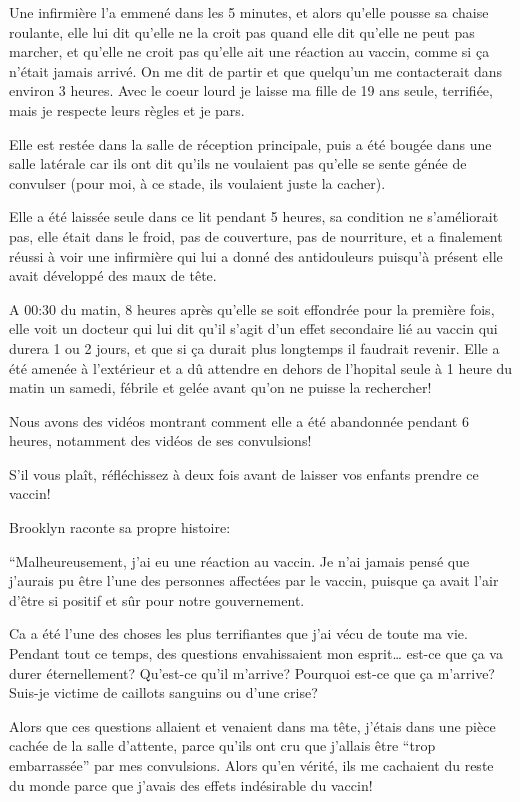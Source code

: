 Une infirmière l'a emmené dans les 5 minutes, et alors qu'elle pousse sa chaise
roulante, elle lui dit qu'elle ne la croit pas quand elle dit qu'elle ne peut
pas marcher, et qu'elle ne croit pas qu'elle ait une réaction au vaccin, comme
si ça n'était jamais arrivé. On me dit de partir et que quelqu'un me
contacterait dans environ 3 heures. Avec le coeur lourd je laisse ma fille de 19
ans seule, terrifiée, mais je respecte leurs règles et je pars.

Elle est restée dans la salle de réception principale, puis a été bougée dans
une salle latérale car ils ont dit qu'ils ne voulaient pas qu'elle se sente
génée de convulser (pour moi, à ce stade, ils voulaient juste la cacher).

Elle a été laissée seule dans ce lit pendant 5 heures, sa condition ne
s'améliorait pas, elle était dans le froid, pas de couverture, pas de
nourriture, et a finalement réussi à voir une infirmière qui lui a donné des
antidouleurs puisqu'à présent elle avait développé des maux de tête.

A 00:30 du matin, 8 heures après qu'elle se soit effondrée pour la première
fois, elle voit un docteur qui lui dit qu'il s'agit d'un effet secondaire lié au
vaccin qui durera 1 ou 2 jours, et que si ça durait plus longtemps il faudrait
revenir. Elle a été amenée à l'extérieur et a dû attendre en dehors de l'hopital
seule à 1 heure du matin un samedi, fébrile et gelée avant qu'on ne puisse la
rechercher!

Nous avons des vidéos montrant comment elle a été abandonnée pendant 6 heures,
notamment des vidéos de ses convulsions!

S'il vous plaît, réfléchissez à deux fois avant de laisser vos enfants prendre
ce vaccin!

Brooklyn raconte sa propre histoire:

“Malheureusement, j'ai eu une réaction au vaccin. Je n'ai jamais pensé que
j'aurais pu être l'une des personnes affectées par le vaccin, puisque ça avait
l'air d'être si positif et sûr pour notre gouvernement.

Ca a été l'une des choses les plus terrifiantes que j'ai vécu de toute ma
vie. Pendant tout ce temps, des questions envahissaient mon esprit… est-ce que
ça va durer éternellement? Qu'est-ce qu'il m'arrive? Pourquoi est-ce que ça
m'arrive? Suis-je victime de caillots sanguins ou d'une crise?

Alors que ces questions allaient et venaient dans ma tête, j'étais dans une
pièce cachée de la salle d'attente, parce qu'ils ont cru que j'allais être “trop
embarrassée” par mes convulsions. Alors qu'en vérité, ils me cachaient du reste
du monde parce que j'avais des effets indésirable du vaccin!

